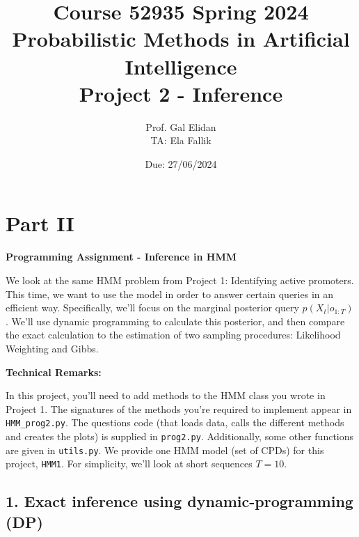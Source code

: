 \documentclass{article}
\title{Course 52935 Spring 2024\\ Probabilistic Methods in Artificial Intelligence\\ Project 2 - Inference}
\author{Prof. Gal Elidan \\ TA: Ela Fallik}
\date{Due: 27/06/2024}
\begin{document}
\maketitle

\section*{Part II}
\textbf{Programming Assignment - Inference in HMM}

We look at the same HMM problem from Project 1: Identifying active promoters. This time, we want to use the model in order to answer certain queries in an efficient way. Specifically, we’ll focus on the marginal posterior query $p(X_t | o_{1:T})$. We’ll use dynamic programming to calculate this posterior, and then compare the exact calculation to the estimation of two sampling procedures: Likelihood Weighting and Gibbs.

\textbf{Technical Remarks:}

In this project, you’ll need to add methods to the HMM class you wrote in Project 1. The signatures of the methods you’re required to implement appear in \texttt{HMM\_prog2.py}. The questions code (that loads data, calls the different methods and creates the plots) is supplied in \texttt{prog2.py}. Additionally, some other functions are given in \texttt{utils.py}. We provide one HMM model (set of CPDs) for this project, \texttt{HMM1}. For simplicity, we’ll look at short sequences $T = 10$.

\subsection*{1. Exact inference using dynamic-programming (DP)}
\end{document}
